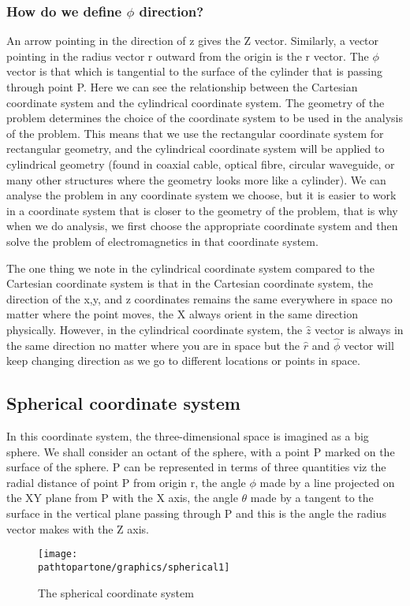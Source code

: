\subsubsection*{ How do we define $\phi$ direction?} 
An arrow pointing in the direction of z gives the Z vector. Similarly, a vector pointing in the radius vector r outward from the origin is the r vector. The $\phi$ vector is that which is tangential to the surface of the cylinder that is passing through point P. Here we can see the relationship between the Cartesian coordinate system and the cylindrical coordinate system. The geometry of the problem determines the choice of the coordinate system to be used in the analysis of the problem. This means that we use the rectangular coordinate system for rectangular geometry, and the cylindrical coordinate system will be applied to cylindrical geometry (found in coaxial cable, optical fibre, circular waveguide, or many other structures where the geometry looks more like a cylinder).  We can analyse the problem in any coordinate system we choose, but it is easier to work in a coordinate system that is closer to the geometry of the problem, that is why when we do analysis, we first choose the appropriate coordinate system and then solve the problem of electromagnetics in that coordinate system.

The one thing we note in the cylindrical coordinate system compared to the Cartesian coordinate system is that in the Cartesian coordinate system, the direction of the x,y, and z coordinates remains the same everywhere in space no matter where the point moves, the X always orient in the same direction physically. However, in the cylindrical coordinate system, the $\hat{z}$ vector is always in the same direction no matter where you are in space but the $\hat{r}$ and $\hat{\phi}$ vector will keep changing direction as we go to different locations or points in space.

\subsection{Spherical coordinate system}
In this coordinate system, the three-dimensional space is imagined as a big sphere. We shall consider an octant of the sphere, with a point P marked on the surface of the sphere. P can be represented in terms of three quantities viz the radial distance of point P from origin r, the angle $\phi$ made by a line projected on the XY plane from P with the X axis, the angle $\theta$ made by a tangent to the surface in the vertical plane passing through P and this is the angle the radius vector makes with the Z axis.
\begin{figure}[h]
\centering
\texttt{[image: \\pathtopartone/graphics/spherical1]}
\caption{The spherical  coordinate system}
\end{figure}

